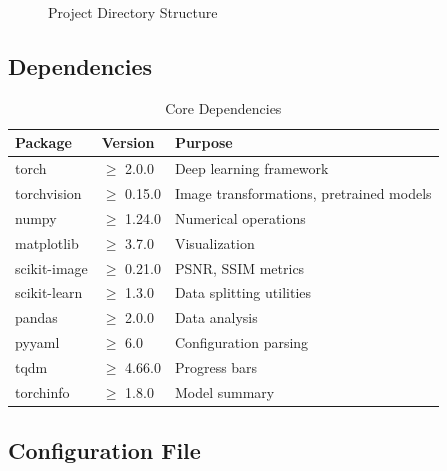 \documentclass[11pt,a4paper]{article}
\begin{document}
\begin{figure}[H]
    \caption{Project Directory Structure}
    \label{fig:project-structure}
\end{figure}

\subsection{Dependencies}

\begin{table}[H]
    \centering
    \caption{Core Dependencies}
    \label{tab:dependencies}
    \begin{tabular}{llp{7cm}}
        \toprule
        \textbf{Package} & \textbf{Version} & \textbf{Purpose} \\
        \midrule
        torch & $\geq$ 2.0.0 & Deep learning framework \\
        torchvision & $\geq$ 0.15.0 & Image transformations, pretrained models \\
        numpy & $\geq$ 1.24.0 & Numerical operations \\
        matplotlib & $\geq$ 3.7.0 & Visualization \\
        scikit-image & $\geq$ 0.21.0 & PSNR, SSIM metrics \\
        scikit-learn & $\geq$ 1.3.0 & Data splitting utilities \\
        pandas & $\geq$ 2.0.0 & Data analysis \\
        pyyaml & $\geq$ 6.0 & Configuration parsing \\
        tqdm & $\geq$ 4.66.0 & Progress bars \\
        torchinfo & $\geq$ 1.8.0 & Model summary \\
        \bottomrule
    \end{tabular}
\end{table}

\subsection{Configuration File}
\end{document}
